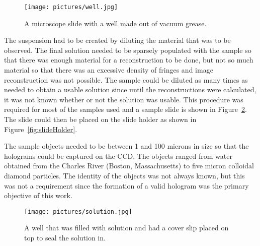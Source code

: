 \begin{figure}[htbp!]
\begin{center}
    \texttt{[image: pictures/well.jpg]}
\end{center}
\caption{A microscope slide with a well made out of vacuum grease.}
\label{fig:well}
\end{figure}

The suspension had to be created by diluting the material that was to be
observed.
The final solution needed to be
sparsely populated with the sample so that there was enough material
for a reconstruction to be done, but not so much material so that there
was an excessive density of fringes and image reconstruction was not possible.
%
%
The sample could be diluted as many
times as needed to obtain a usable solution since until the reconstructions were
calculated, it was not known whether or not the solution was usable.
This procedure was required for most of the
samples used %
and a sample slide is shown in Figure~\ref{fig:solutionSlide}.
The slide could then be
placed on the slide holder %
as shown in Figure~\ref{fig:slideHolder}.

The sample objects
needed to be between 1 and 100 microns in size so that the holograms could
be captured on the CCD\@. The objects ranged from water obtained from the
Charles River (Boston, Massachusetts) to five micron colloidal diamond
particles. The identity of the objects was not always known, but this was not
a requirement since the formation of a valid hologram was the primary objective
of this work.

\begin{figure}[htbp!]
\begin{center}
    \texttt{[image: pictures/solution.jpg]}
\end{center}
\caption{A well that was filled with solution and had a cover slip placed on
top to seal the solution in.}
\label{fig:solutionSlide}
\end{figure}
%
%

